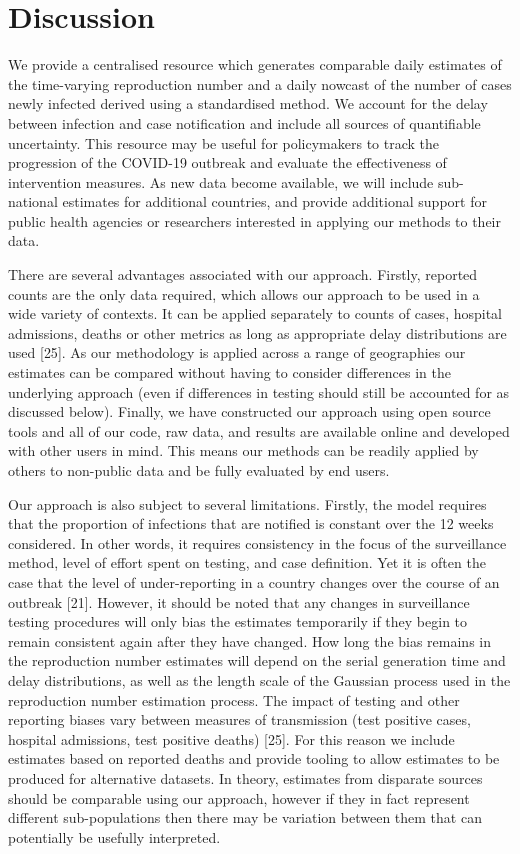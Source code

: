 \documentclass[
]{article}
\begin{document}
\hypertarget{discussion}{%
\section{Discussion}\label{discussion}}

We provide a centralised resource which generates comparable daily
estimates of the time-varying reproduction number and a daily nowcast of
the number of cases newly infected derived using a standardised method.
We account for the delay between infection and case notification and
include all sources of quantifiable uncertainty. This resource may be
useful for policymakers to track the progression of the COVID-19
outbreak and evaluate the effectiveness of intervention measures. As new
data become available, we will include sub-national estimates for
additional countries, and provide additional support for public health
agencies or researchers interested in applying our methods to their
data.

There are several advantages associated with our approach. Firstly,
reported counts are the only data required, which allows our approach to
be used in a wide variety of contexts. It can be applied separately to
counts of cases, hospital admissions, deaths or other metrics as long as
appropriate delay distributions are used {[}25{]}. As our methodology is
applied across a range of geographies our estimates can be compared
without having to consider differences in the underlying approach (even
if differences in testing should still be accounted for as discussed
below). Finally, we have constructed our approach using open source
tools and all of our code, raw data, and results are available online
and developed with other users in mind. This means our methods can be
readily applied by others to non-public data and be fully evaluated by
end users.

Our approach is also subject to several limitations. Firstly, the model
requires that the proportion of infections that are notified is constant
over the 12 weeks considered. In other words, it requires consistency in
the focus of the surveillance method, level of effort spent on testing,
and case definition. Yet it is often the case that the level of
under-reporting in a country changes over the course of an outbreak
{[}21{]}. However, it should be noted that any changes in surveillance
testing procedures will only bias the estimates temporarily if they
begin to remain consistent again after they have changed. How long the
bias remains in the reproduction number estimates will depend on the
serial generation time and delay distributions, as well as the length
scale of the Gaussian process used in the reproduction number estimation
process. The impact of testing and other reporting biases vary between
measures of transmission (test positive cases, hospital admissions, test
positive deaths) {[}25{]}. For this reason we include estimates based on
reported deaths and provide tooling to allow estimates to be produced
for alternative datasets. In theory, estimates from disparate sources
should be comparable using our approach, however if they in fact
represent different sub-populations then there may be variation between
them that can potentially be usefully interpreted.
\end{document}
